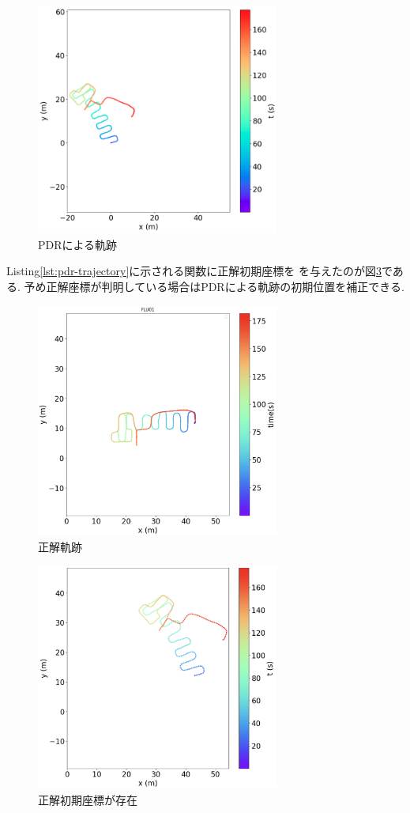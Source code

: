 \begin{figure}[h]
	\centering
	\includegraphics[width=80mm]{image/pdr.jpg}
	\caption{PDRによる軌跡}    \label{fig:pdr}
\end{figure}

Listing\ref{lst:pdr-trajectory}に示される関数に正解初期座標を
を与えたのが図\ref{fig:pdr-move}である.
予め正解座標が判明している場合はPDRによる軌跡の初期位置を補正できる.

\begin{figure}[h]
	\centering
	\includegraphics[width=80mm]{image/gt2.jpg}
	\caption{正解軌跡}    \label{fig:gt-trajectory}
\end{figure}

\begin{figure}[h]
	\centering
	\includegraphics[width=80mm]{image/pdr-move.jpg}
	\caption{正解初期座標が存在}    \label{fig:pdr-move}
\end{figure}


